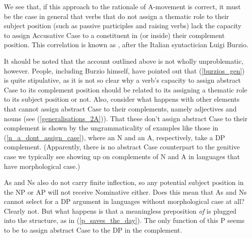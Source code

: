 \documentclass{article}
\begin{document}
We see that, if this approach to the rationale of A-movement is correct, it must be the case in general that verbs that do not assign a thematic role to their subject position (such as passive participles and raising verbs) lack the capacity to assign Accusative Case to a constituent in (or inside) their complement position.
This correlation is known as , after the Italian syntactician Luigi Burzio.
\begin{exe}
    \label{burzios_gen}
\end{exe}
It should be noted that the account outlined above is not wholly unproblematic, however.
People, including Burzio himself, have pointed out that (\ref{burzios_gen}) is quite stipulative, as it is not so clear why a verb’s capacity to assign abstract Case to its complement position should be related to its assigning a thematic role to its subject position or not.
Also, consider what happens with other elements that cannot assign abstract Case to their complements, namely adjectives and nouns (see (\ref{generalisations_2A})).
That these don't assign abstract Case to their complement is shown by the ungrammaticality of examples like those in (\ref{n_a_dont_assign_case}), where an N and an A, respectively, take a DP complement.
(Apparently, there is no abstract Case counterpart to the genitive case we typically see showing up on complements of N and A in languages that have morphological case.)
\begin{exe}
    \label{n_a_dont_assign_case}
\end{exe}
As and Ns also do not carry finite inflection, so any potential subject position in the NP or AP will not receive Nominative either.
Does this mean that As and Ns cannot select for a DP argument in languages without morphological case at all? Clearly not.
But what happens is that a meaningless preposition \emph{of} is plugged into the structure, as in (\ref{p_saves_the_day}).
The only function of this P seems to be to assign abstract Case to the DP in the complement.
\begin{exe}
    \label{p_saves_the_day}
\end{exe}
\end{document}

